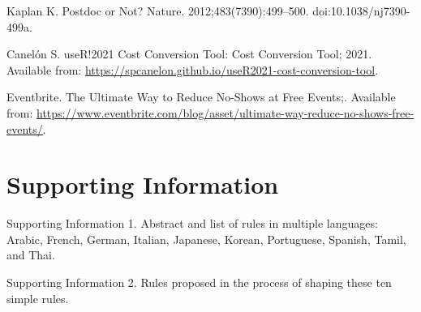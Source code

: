 \documentclass[10pt,letterpaper]{article}
\begin{document}
\begin{thebibliography}{10}
Kaplan K.
\newblock Postdoc or Not?
\newblock Nature. 2012;483(7390):499--500.
\newblock doi:{10.1038/nj7390-499a}.

Canelón S. useR!2021 Cost Conversion Tool: Cost Conversion Tool; 2021.
\newblock Available from:
  \url{https://spcanelon.github.io/useR2021-cost-conversion-tool}.

{Eventbrite}. The Ultimate Way to Reduce No-Shows at Free Events;.
\newblock Available from:
  \url{https://www.eventbrite.com/blog/asset/ultimate-way-reduce-no-shows-free-events/}.

\end{thebibliography}

\section*{Supporting Information}

Supporting Information 1. Abstract and list of rules in multiple languages: Arabic, French, German, Italian, Japanese, Korean, Portuguese, Spanish, Tamil, and Thai.

Supporting Information 2. Rules proposed in the process of shaping these ten simple rules.
\end{document}
